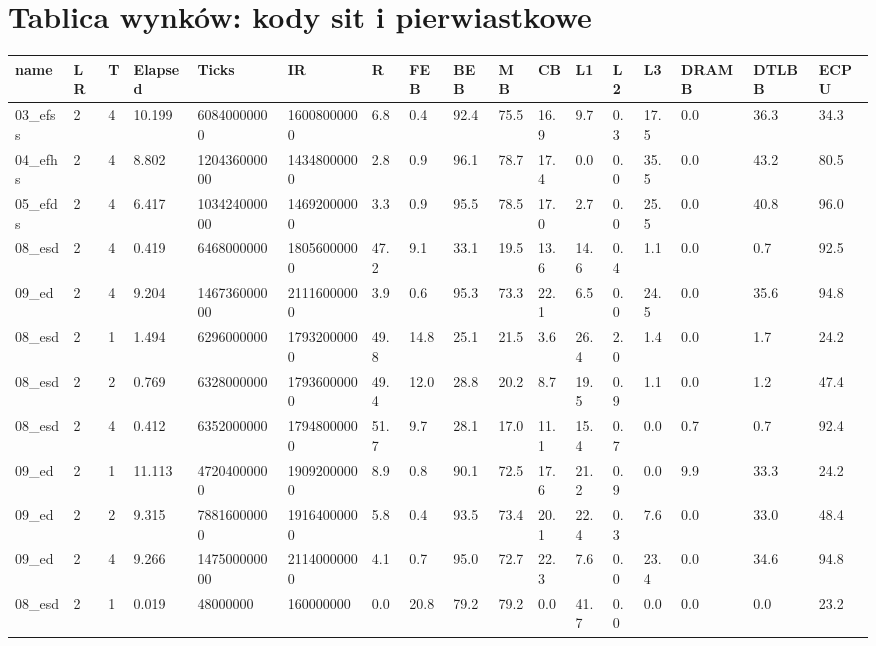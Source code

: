 \documentclass[12pt]{article}
\begin{document}
\section{Tablica wynków: kody sit i pierwiastkowe}
\begin{flushleft}
\begin{landscape}
	\begin{tabular}{| l | l | l | l | l | l | l | l | l | l | l | l | l | l | l | l | l |}
		\hline
		name & LR & T & Elapsed & Ticks & IR & R & FEB & BEB & MB & CB & L1 & L2 & L3 & DRAMB & DTLBB & ECPU \\ \hline
		03\_efss & 2 & 4 & 10.199 & 60840000000 & 16008000000 & 6.8 & 0.4 & 92.4 & 75.5 & 16.9 & 9.7 & 0.3 & 17.5 & 0.0 & 36.3 & 34.3 \\ \hline
		04\_efhs & 2 & 4 & 8.802 & 120436000000 & 14348000000 & 2.8 & 0.9 & 96.1 & 78.7 & 17.4 & 0.0 & 0.0 & 35.5 & 0.0 & 43.2 & 80.5 \\ \hline
		05\_efds & 2 & 4 & 6.417 & 103424000000 & 14692000000 & 3.3 & 0.9 & 95.5 & 78.5 & 17.0 & 2.7 & 0.0 & 25.5 & 0.0 & 40.8 & 96.0 \\ \hline
		08\_esd & 2 & 4 & 0.419 & 6468000000 & 18056000000 & 47.2 & 9.1 & 33.1 & 19.5 & 13.6 & 14.6 & 0.4 & 1.1 & 0.0 & 0.7 & 92.5 \\ \hline
		09\_ed & 2 & 4 & 9.204 & 146736000000 & 21116000000 & 3.9 & 0.6 & 95.3 & 73.3 & 22.1 & 6.5 & 0.0 & 24.5 & 0.0 & 35.6 & 94.8 \\ \hline
		08\_esd & 2 & 1 & 1.494 & 6296000000 & 17932000000 & 49.8 & 14.8 & 25.1 & 21.5 & 3.6 & 26.4 & 2.0 & 1.4 & 0.0 & 1.7 & 24.2 \\ \hline
		08\_esd & 2 & 2 & 0.769 & 6328000000 & 17936000000 & 49.4 & 12.0 & 28.8 & 20.2 & 8.7 & 19.5 & 0.9 & 1.1 & 0.0 & 1.2 & 47.4 \\ \hline
		08\_esd & 2 & 4 & 0.412 & 6352000000 & 17948000000 & 51.7 & 9.7 & 28.1 & 17.0 & 11.1 & 15.4 & 0.7 & 0.0 & 0.7 & 0.7 & 92.4 \\ \hline
		09\_ed & 2 & 1 & 11.113 & 47204000000 & 19092000000 & 8.9 & 0.8 & 90.1 & 72.5 & 17.6 & 21.2 & 0.9 & 0.0 & 9.9 & 33.3 & 24.2 \\ \hline
		09\_ed & 2 & 2 & 9.315 & 78816000000 & 19164000000 & 5.8 & 0.4 & 93.5 & 73.4 & 20.1 & 22.4 & 0.3 & 7.6 & 0.0 & 33.0 & 48.4 \\ \hline
		09\_ed & 2 & 4 & 9.266 & 147500000000 & 21140000000 & 4.1 & 0.7 & 95.0 & 72.7 & 22.3 & 7.6 & 0.0 & 23.4 & 0.0 & 34.6 & 94.8 \\ \hline
		08\_esd & 2 & 1 & 0.019 & 48000000 & 160000000 & 0.0 & 20.8 & 79.2 & 79.2 & 0.0 & 41.7 & 0.0 & 0.0 & 0.0 & 0.0 & 23.2 \\ \hline

\end{tabular}
\end{landscape}
\end{flushleft}
\end{document}
